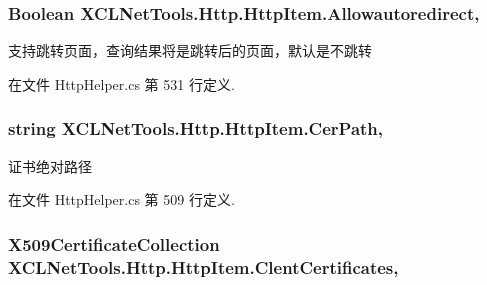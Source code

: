 \hypertarget{class_x_c_l_net_tools_1_1_http_1_1_http_item_a60ff89a364c32983810266a814e8fb2b}{
\subsubsection[{Allowautoredirect}]{\setlength{\rightskip}{0pt plus 5cm}Boolean X\-C\-L\-Net\-Tools.\-Http.\-Http\-Item.\-Allowautoredirect\hspace{0.3cm}{\ttfamily [get]}, {\ttfamily [set]}}}\label{class_x_c_l_net_tools_1_1_http_1_1_http_item_a60ff89a364c32983810266a814e8fb2b}


支持跳转页面，查询结果将是跳转后的页面，默认是不跳转 



在文件 Http\-Helper.\-cs 第 531 行定义.

\hypertarget{class_x_c_l_net_tools_1_1_http_1_1_http_item_a2a500cb7819053bff9e48a50cfd987ca}{
\subsubsection[{Cer\-Path}]{\setlength{\rightskip}{0pt plus 5cm}string X\-C\-L\-Net\-Tools.\-Http.\-Http\-Item.\-Cer\-Path\hspace{0.3cm}{\ttfamily [get]}, {\ttfamily [set]}}}\label{class_x_c_l_net_tools_1_1_http_1_1_http_item_a2a500cb7819053bff9e48a50cfd987ca}


证书绝对路径 



在文件 Http\-Helper.\-cs 第 509 行定义.

\hypertarget{class_x_c_l_net_tools_1_1_http_1_1_http_item_a5f720ce1c69320ec28f2c8de373f52a0}{
\subsubsection[{Clent\-Certificates}]{\setlength{\rightskip}{0pt plus 5cm}X509\-Certificate\-Collection X\-C\-L\-Net\-Tools.\-Http.\-Http\-Item.\-Clent\-Certificates\hspace{0.3cm}{\ttfamily [get]}, {\ttfamily [set]}}}\label{class_x_c_l_net_tools_1_1_http_1_1_http_item_a5f720ce1c69320ec28f2c8de373f52a0}


